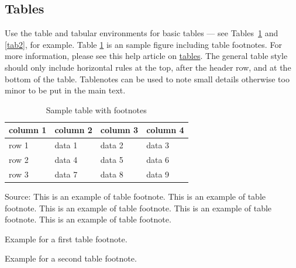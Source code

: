 \documentclass[10pt,a4paper]{article}
\begin{document}
\begin{appendices}
\section{Tables}\label{sec5}

Use the table and tabular environments for basic tables --- see Tables~\ref{tab1} and \ref{tab2}, for example. Table \ref{tab1} is an sample figure including table footnotes. For more information, please see this help article on \href{https://www.overleaf.com/learn/latex/tables}{tables}. The general table style should only include horizontal rules at the top, after the header row, and at the bottom of the table. Tablenotes can be used to note small details otherwise too minor to be put in the main text.

\begin{table}[!ht]
\caption{Sample table with footnotes\label{tab1}}
\begin{threeparttable}
\begin{tabular*}{\columnwidth}{@{\extracolsep\fill}llll@{\extracolsep\fill}}
\toprule
column 1 & column 2 & column 3 & column 4\\
\midrule
row 1 & data 1 & data 2 & data 3 \\
row 2 & data 4 & data 5\tnote{1} & data 6 \\
row 3 & data 7 & data 8 & data 9\tnote{2} \\
\bottomrule
\end{tabular*}
\begin{tablenotes}
\item Source: This is an example of table footnote. This is an example of table footnote. This is an example of table footnote. This is an example of table footnote. This is an example of table footnote.
\item[1] Example for a first table footnote.
\item[2] Example for a second table footnote.
\end{tablenotes}
\end{threeparttable}
\end{table}


\end{appendices}
\end{document}
